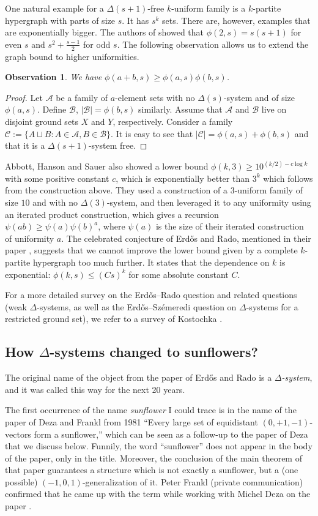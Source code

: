 \documentclass[graybox]{svmult}
\renewcommand{\le}{\leqslant}
\renewcommand{\ge}{\geqslant}
\newcommand{\aaa}{\mathcal{A}}
\newcommand{\bb}{\mathcal{B}}
\newcommand{\m}{\mathcal}
\newtheorem{obs}[thm]{Observation}
\begin{document}
One natural example for a $\Delta(s+1)$-free $k$-uniform family is a $k$-partite hypergraph with parts of size $s$. It has $s^k$ sets. There are, however, examples that are exponentially bigger. The authors of \cite{AHS} showed that $\phi(2,s)=s(s+1)$ for even $s$ and $s^2+\frac{s-1}2$ for odd $s$.  The following observation allows us to extend the graph bound to higher uniformities. \begin{obs}We have $\phi(a+b,s)\ge \phi(a,s)\phi(b,s)$.\end{obs}
\begin{proof} Let $\aaa$ be a family of $a$-element sets with no $\Delta(s)$-system and of size $\phi(a,s)$. Define $\bb$, $|\bb| = \phi(b,s)$ similarly. Assume that $\aaa$ and $\bb$ live on disjoint ground sets $X$ and $Y$, respectively. Consider a family $\m C:=\{A\sqcup B: A\in \m A, B\in \m B\}$. It is easy to see that $|\m C| = \phi(a,s)+\phi(b,s)$ and that it is a $\Delta(s+1)$-system free.
\end{proof}
Abbott, Hanson and Sauer also showed a lower bound $\phi(k,3)\ge 10^{(k/2)-c\log k}$ with some positive constant $c$, which is exponentially better than $3^k$ which follows from the construction above. They used a construction of a $3$-uniform family of size $10$ and with no $\Delta(3)$-system, and then leveraged it to any uniformity using an iterated product construction, which gives a recursion $\psi(ab)\ge \psi(a)\psi(b)^a$, where $\psi(a)$ is the size of their iterated construction of uniformity $a$.
The celebrated conjecture of Erd\H os and Rado, mentioned in their paper \cite{ER}, suggests that we cannot improve the lower bound given by a complete $k$-partite hypergraph too much further. It states that the dependence on $k$ is exponential: $\phi(k,s)\le (Cs)^k$ for some absolute constant $C$.

For a more detailed survey on the Erd\H os--Rado question and related questions (weak $\Delta$-systems, as well as the Erd\H os--Sz\'emeredi question on $\Delta$-systems for a restricted ground set), we refer to a survey of Kostochka \cite{Kost00}.


\subsection{How $\Delta$-systems changed to sunflowers?}
The original name of the object from the paper of Erd\H os and Rado is a {\it $\Delta$-system}, and it was called this way for the next 20 years.

The first occurrence of the name {\it sunflower} I could trace is in the name of the paper of Deza and Frankl \cite{DF} from 1981 ``Every large set of equidistant $(0,+1,-1)$-vectors form a sunflower,'' which can be seen as a follow-up to the paper of Deza \cite{D0} that we discuss below. Funnily, the word ``sunflower'' does not appear in the body of the paper, only in the title. Moreover, the conclusion of the main theorem of that paper guarantees a structure which is not exactly a sunflower, but a (one possible) $(-1,0,1)$-generalization of it. Peter Frankl (private communication) confirmed that he came up with the term while working with Michel Deza on the paper \cite{DF}.
\end{document}
